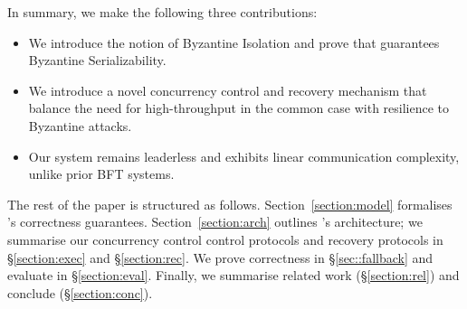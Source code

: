 In summary, we make the following three contributions: 
\begin{itemize}
\item We introduce the notion of Byzantine Isolation and prove that \sys guarantees
Byzantine Serializability.
\item We introduce a novel concurrency control and recovery  mechanism that balance the need for high-throughput in
the common case with resilience to Byzantine attacks.
\item Our system remains leaderless and exhibits linear communication complexity, unlike prior BFT systems. 
\end{itemize}


The rest of the paper is structured as follows. Section~\ref{section:model} formalises \sys{}'s correctness guarantees.
Section~\ref{section:arch} outlines
\sys's architecture; we summarise our concurrency control control protocols and recovery protocols in \S\ref{section:exec} and \S\ref{section:rec}. We
prove correctness in \S\ref{sec::fallback} and evaluate \sys in \S\ref{section:eval}. Finally, we summarise related work (\S\ref{section:rel}) and conclude (\S\ref{section:conc}).

